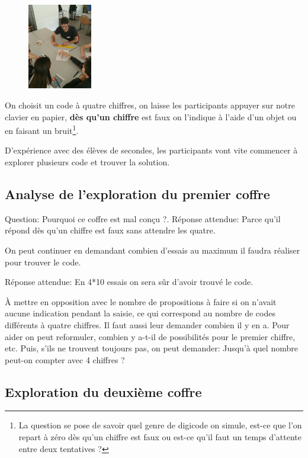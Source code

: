 \documentclass[a4paper]{article}
\newcommand{\guill}[1]{\og{}#1\fg{}}
\begin{document}
\begin{figure}
\centering
\includegraphics[width=0.25\textwidth]{digicode-ecole-sif.jpg}
\end{figure}


On choisit un code à quatre chiffres, on laisse les participants appuyer sur notre clavier en papier, \textbf{dès qu'un chiffre} est faux on l'indique à l'aide d'un objet ou en faisant un bruit\footnote{La question se pose de savoir quel genre de digicode on simule, est-ce que l'on repart à zéro dès qu'un chiffre est faux ou est-ce qu'il faut un temps d'attente entre deux tentatives ?}.

D'expérience avec des élèves de secondes, les participants vont vite commencer à explorer plusieurs code et trouver la solution.


\subsection{Analyse de l'exploration du premier coffre}

Question: \guill{Pourquoi ce coffre est mal conçu ?}.
Réponse attendue: \guill{Parce qu'il répond dès qu'un chiffre est faux sans attendre les quatre}.

On peut continuer en demandant combien d'essais au maximum il faudra réaliser pour trouver le code.

Réponse attendue: En 4*10 essais on sera sûr d'avoir trouvé le code.

À mettre en opposition avec le nombre de propositions à faire si on n'avait aucune indication pendant la saisie, ce qui correspond au nombre de codes différents à quatre chiffres. Il faut aussi leur demander combien il y en a.
Pour aider on peut reformuler, \guill{combien y a-t-il de possibilités pour le premier chiffre, etc.}
Puis, s'ils ne trouvent toujours pas, on peut demander: \guill{Jusqu'à quel nombre peut-on compter avec 4 chiffres ?}


\subsection{Exploration du deuxième coffre}
\end{document}
